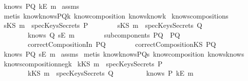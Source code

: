 \begin{isabellebody}
\ {\isachardoublequoteopen}knows\ PQ\ {\isacharbrackleft}kE\ m{\isacharbrackright}{\isachardoublequoteclose}\isanewline
%
\isadelimproof
%
\endisadelimproof
%
\isatagproof
{}\isamarkupfalse%
\ assms\isanewline
{}\isamarkupfalse%
\ {\isacharparenleft}metis\ know{}knowsPQ{\isacharunderscore}k\ know{\isacharunderscore}composition\ knows{}know{\isacharunderscore}k{\isacharparenright}%
\endisatagproof
{\isafoldproof}%
%
\isadelimproof
\isanewline
%
\endisadelimproof
\isanewline
{}\isamarkupfalse%
\ knows{\isacharunderscore}composition{}{\isacharunderscore}s{\isacharcolon}\isanewline
{}\ {\isachardoublequoteopen}{\isacharparenleft}sKS\ m{\isacharparenright}\ {\isasymnotin}\ specKeysSecrets\ P{\isachardoublequoteclose}\isanewline
\ \ \ \ \ \ \ \ {\isachardoublequoteopen}{\isacharparenleft}sKS\ m{\isacharparenright}\ {\isasymnotin}\ specKeysSecrets\ Q{\isachardoublequoteclose}\isanewline
\ \ \ \ \ \ \ \ {\isachardoublequoteopen}knows\ Q\ {\isacharbrackleft}sE\ m{\isacharbrackright}{\isachardoublequoteclose}\isanewline
\ \ \ \ \ \ \ \ {\isachardoublequoteopen}subcomponents\ PQ\ {\isacharequal}\ {\isacharbraceleft}P{\isacharcomma}Q{\isacharbraceright}{\isachardoublequoteclose}\isanewline
\ \ \ \ \ \ \ \ {\isachardoublequoteopen}correctCompositionIn\ PQ{\isachardoublequoteclose}\isanewline
\ \ \ \ \ \ \ \ {\isachardoublequoteopen}correctCompositionKS\ PQ{\isachardoublequoteclose}\ \isanewline
{}\ {\isachardoublequoteopen}knows\ PQ\ {\isacharbrackleft}sE\ m{\isacharbrackright}{\isachardoublequoteclose}\isanewline
%
\isadelimproof
%
\endisadelimproof
%
\isatagproof
{}\isamarkupfalse%
\ assms\isanewline
{}\isamarkupfalse%
\ {\isacharparenleft}metis\ know{}knowsPQ{\isacharunderscore}s\ know{\isacharunderscore}composition\ knows{}know{\isacharunderscore}s{\isacharparenright}%
\endisatagproof
{\isafoldproof}%
%
\isadelimproof
\isanewline
%
\endisadelimproof
\isanewline
{}\isamarkupfalse%
\ knows{\isacharunderscore}composition{\isacharunderscore}neg{}{\isacharunderscore}k{\isacharcolon}\isanewline
{}\ {\isachardoublequoteopen}kKS\ m\ {\isasymnotin}\ specKeysSecrets\ P{\isachardoublequoteclose}\isanewline
\ \ \ \ \ \ \ \ {\isachardoublequoteopen}kKS\ m\ {\isasymnotin}\ specKeysSecrets\ Q{\isachardoublequoteclose}\isanewline
\ \ \ \ \ \ \ \ {\isachardoublequoteopen}{\isasymnot}\ knows\ P\ {\isacharbrackleft}kE\ m{\isacharbrackright}{\isachardoublequoteclose}\isanewline

\end{isabellebody}
